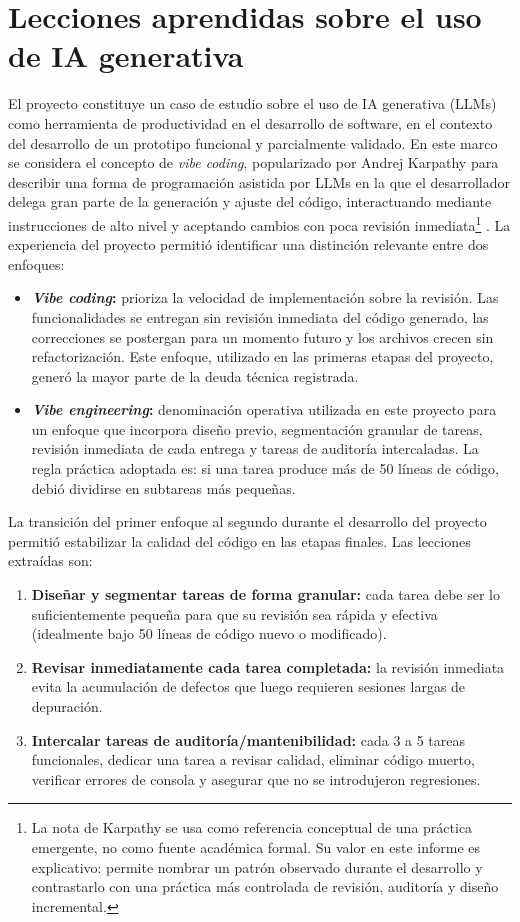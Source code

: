 \documentclass[final]{udpthesis}
\begin{document}
\section{Lecciones aprendidas sobre el uso de IA generativa}

El proyecto constituye un caso de estudio sobre el uso de IA generativa (LLMs) como herramienta de productividad en el desarrollo de software, en el contexto del desarrollo de un prototipo funcional y parcialmente validado. En este marco se considera el concepto de \textit{vibe coding}, popularizado por Andrej Karpathy para describir una forma de programación asistida por LLMs en la que el desarrollador delega gran parte de la generación y ajuste del código, interactuando mediante instrucciones de alto nivel y aceptando cambios con poca revisión inmediata\footnote{La nota de Karpathy se usa como referencia conceptual de una práctica emergente, no como fuente académica formal. Su valor en este informe es explicativo: permite nombrar un patrón observado durante el desarrollo y contrastarlo con una práctica más controlada de revisión, auditoría y diseño incremental.} \cite{karpathy-vibe-coding}. La experiencia del proyecto permitió identificar una distinción relevante entre dos enfoques:

\begin{itemize}
    \item \textbf{\textit{Vibe coding}:} prioriza la velocidad de implementación sobre la revisión. Las funcionalidades se entregan sin revisión inmediata del código generado, las correcciones se postergan para un momento futuro y los archivos crecen sin refactorización. Este enfoque, utilizado en las primeras etapas del proyecto, generó la mayor parte de la deuda técnica registrada.
    \item \textbf{\textit{Vibe engineering}:} denominación operativa utilizada en este proyecto para un enfoque que incorpora diseño previo, segmentación granular de tareas, revisión inmediata de cada entrega y tareas de auditoría intercaladas. La regla práctica adoptada es: si una tarea produce más de 50 líneas de código, debió dividirse en subtareas más pequeñas.
\end{itemize}

La transición del primer enfoque al segundo durante el desarrollo del proyecto permitió estabilizar la calidad del código en las etapas finales. Las lecciones extraídas son:

\begin{enumerate}
    \item \textbf{Diseñar y segmentar tareas de forma granular:} cada tarea debe ser lo suficientemente pequeña para que su revisión sea rápida y efectiva (idealmente bajo 50 líneas de código nuevo o modificado).
    \item \textbf{Revisar inmediatamente cada tarea completada:} la revisión inmediata evita la acumulación de defectos que luego requieren sesiones largas de depuración.
    \item \textbf{Intercalar tareas de auditoría/mantenibilidad:} cada 3 a 5 tareas funcionales, dedicar una tarea a revisar calidad, eliminar código muerto, verificar errores de consola y asegurar que no se introdujeron regresiones.
\end{enumerate}
\end{document}
